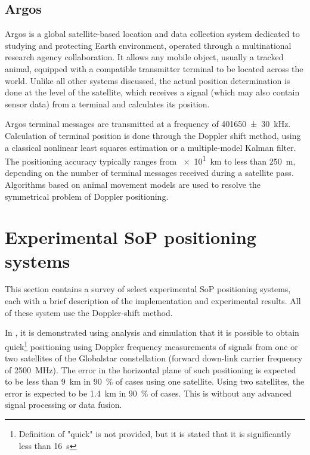 \subsection{Argos}
Argos is a global satellite-based location and data collection system dedicated to studying and protecting Earth environment, operated through a multinational research agency collaboration. It allows any mobile object, usually a tracked animal, equipped with a compatible transmitter terminal to be located across the world\cite{sat17}. Unlike all other systems discussed, the actual position determination is done at the level of the satellite, which receives a signal (which may also contain sensor data) from a terminal and calculates its position.

Argos terminal messages are transmitted at a frequency of \qty{401650(30)}{kHz}. Calculation of terminal position is done through the Doppler shift method, using a classical nonlinear least squares estimation or a multiple-model Kalman filter. The positioning accuracy typically ranges from \qty{e1}{km} to less than \qty{250}{m}, depending on the number of terminal messages received during a satellite pass\cite{sop09}. Algorithms based on animal movement models are used to resolve the symmetrical problem of Doppler positioning\cite{sat17}.



\section{Experimental SoP positioning systems}
This section contains a survey of select experimental SoP positioning systems, each with a brief description of the implementation and experimental results. All of these system use the Doppler-shift method.

In \cite{sop07}, it is demonstrated using analysis and simulation that it is possible to obtain quick\footnote{Definition of "quick" is not provided, but it is stated that it is significantly less than \qty{16}{\s}} positioning using Doppler frequency measurements of signals from one or two satellites of the Globalstar constellation (forward down-link carrier frequency of \qty{2500}{\mega\hertz}). The error in the horizontal plane of such positioning is expected to be less than \qty{9}{\km} in \qty{90}{\percent} of cases using one satellite. Using two satellites, the error is expected to be \qty{1.4}{\km} in \qty{90}{\percent} of cases. This is without any advanced signal processing or data fusion.

